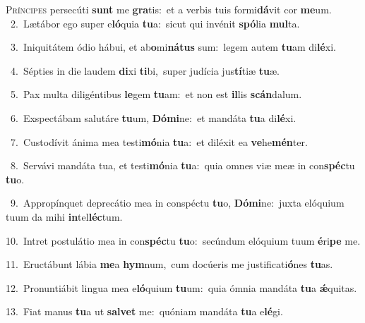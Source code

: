 \lettrine{\initial\textcolor{\initialcolor}{P}}{ríncipes} persecúti \textbf{sunt} me \textbf{gra}\-tis:~\star et a verbis tuis formi\-\textbf{dá}\-vit cor \textbf{me}\-um.\\
{\numbfont\textcolor{\numbcolor}{~2.}}~Lætábor ego super e\-\textbf{ló}\-quia \textbf{tu}\-a:~\star sicut qui invénit \textbf{spó}\-lia \textbf{mul}\-ta.\par
{\numbfont\textcolor{\numbcolor}{~3.}}~Iniquitátem ódio hábui, et ab\-\textbf{o}\-mi\-\textbf{ná}\-\textbf{tus} sum:~\star legem autem \textbf{tu}\-am di\-\textbf{lé}\-xi.\par
{\numbfont\textcolor{\numbcolor}{~4.}}~Sépties in die laudem \textbf{di}\-xi \textbf{ti}\-bi,~\star super judícia jus\-\textbf{tí}\-tiæ \textbf{tu}\-æ.\par
{\numbfont\textcolor{\numbcolor}{~5.}}~Pax multa diligéntibus \textbf{le}\-gem \textbf{tu}\-am:~\star et non est \textbf{il}\-lis \textbf{scán}\-dalum.\par
{\numbfont\textcolor{\numbcolor}{~6.}}~Exspectábam salutáre \textbf{tu}\-um, \textbf{Dó}\-\textbf{mi}ne:~\star et mandáta \textbf{tu}\-a di\-\textbf{lé}\-xi.\par
{\numbfont\textcolor{\numbcolor}{~7.}}~Custodívit ánima mea testi\-\textbf{mó}\-nia \textbf{tu}\-a:~\star et diléxit ea \textbf{ve}\-he\-\textbf{mén}\-ter.\par
{\numbfont\textcolor{\numbcolor}{~8.}}~Servávi mandáta tua, et testi\-\textbf{mó}\-nia \textbf{tu}\-a:~\star quia omnes viæ meæ in con\-\textbf{spéc}\-tu \textbf{tu}\-o.\par
{\numbfont\textcolor{\numbcolor}{~9.}}~Appropínquet deprecátio mea in conspéctu \textbf{tu}\-o, \textbf{Dó}\-\textbf{mi}ne:~\star juxta elóquium tuum da mihi \textbf{in}\-tel\-\textbf{léc}\-tum.\par
{\numbfont\textcolor{\numbcolor}{10.}}~Intret postulátio mea in con\-\textbf{spéc}\-tu \textbf{tu}\-o:~\star secúndum elóquium tuum \textbf{é}\-ri\textbf{pe} me.\par
{\numbfont\textcolor{\numbcolor}{11.}}~Eructábunt lábia \textbf{me}\-a \textbf{hym}\-num,~\star cum docúeris me justificati\-\textbf{ó}\-nes \textbf{tu}\-as.\par
{\numbfont\textcolor{\numbcolor}{12.}}~Pronuntiábit lingua mea e\-\textbf{ló}\-quium \textbf{tu}\-um:~\star quia ómnia mandáta \textbf{tu}\-a \textbf{ǽ}\-quitas.\par
{\numbfont\textcolor{\numbcolor}{13.}}~Fiat manus \textbf{tu}\-a ut \textbf{sal}\-\textbf{vet} me:~\star quóniam mandáta \textbf{tu}\-a e\-\textbf{lé}\-gi.\par
